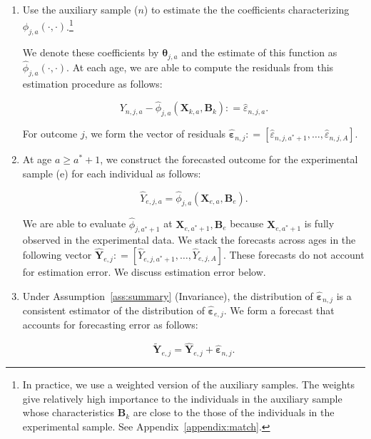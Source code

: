 \begin{enumerate}
\item Use the auxiliary sample ($n$) to estimate the the coefficients characterizing $\phi_{j,a} \left( \cdot , \cdot \right)$.\footnote{In practice, we use a weighted version of the auxiliary samples. The weights give relatively high importance to the individuals in the auxiliary sample whose characteristics $\bm{B}_k$ are close to the those of the individuals in the experimental sample. See Appendix~\ref{appendix:match}.}

We denote these coefficients by $\bm{\theta}_{j,a}$ and the estimate of this function as $\hat{\phi}_{j,a} \left( \cdot , \cdot \right)$. At each age, we are able to compute the residuals from this estimation procedure as follows:

\begin{equation}
Y_{n,j,a} -  \hat{\phi}_{j,a} (\bm{X}_{k,a}, \bm{B}_k) : = \hat{\varepsilon}_{n,j,a}.
\end{equation}

\noindent For outcome $j$, we form the vector of residuals $\hat{\bm{\varepsilon}}_{n,j} : = \left[ \hat{\varepsilon}_{n,j,a^*+1}, \ldots, \hat{\varepsilon}_{n,j,A} \right]$.

\item At age $a \geq a^*+1$, we construct the forecasted outcome for the experimental sample (e) for each individual as follows:

\begin{equation}
\hat{Y}_{e,j,a} = \hat{\phi}_{j,a} \left( \bm{X}_{e,a}, \bm{B}_e \right).
\end{equation}

\noindent We are able to evaluate $\hat{\phi}_{j,a^*+1}$ at $ \bm{X}_{e,a^*+1}, \bm{B}_e $ because $\bm{X}_{e,a^*+1}$ is fully observed in the experimental data. We stack the forecasts across ages in the following vector $\hat{\bm{Y}}_{e,j} : = \left[ \hat{Y}_{e,j,a^*+1}, \ldots,  \hat{Y}_{e,j,A} \right]$. These forecasts do not account for estimation error. We discuss estimation error below.

\item Under Assumption~\ref{ass:summary} (Invariance), the distribution of $\hat{\bm{\varepsilon}}_{n,j}$ is a consistent estimator of the distribution of $\hat{\bm{\varepsilon}}_{e,j}$. We form a forecast that accounts for forecasting error as follows:

\begin{equation}
\tilde{\bm{Y}}_{e,j} = \hat{\bm{Y}}_{e,j} + \hat{\bm{\varepsilon}}_{n,j}.
\end{equation}


\end{enumerate}
